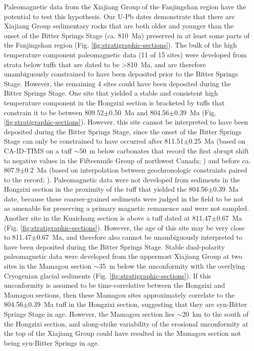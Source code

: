 Paleomagnetic data from the Xiajiang Group of the Fanjingshan region have the potential to test this hypothesis. Our U-Pb dates demonstrate that there are Xiajiang Group sedimentary rocks that are both older and younger than the onset of the Bitter Springs Stage (ca. 810~Ma) preserved in at least some parts of the Fanjingshan region (Fig. \ref{fig:stratigraphic-sections}). The bulk of the high temperature component paleomagnetic data (11 of 15 sites) were developed from strata below tuffs that are dated to be \textgreater 810~Ma, and are therefore unambiguously constrained to have been deposited prior to the Bitter Springs Stage. However, the remaining 4 sites could have been deposited during the Bitter Springs Stage. One site that yielded a stable and consistent high temperature component in the Hongzixi section is bracketed by tuffs that constrain it to be between 809.52$\pm$0.50~Ma and 804.56$\pm$0.39~Ma (Fig. \ref{fig:stratigraphic-sections}). However, this site cannot be interpreted to have been deposited during the Bitter Springs Stage, since the onset of the Bitter Springs Stage can only be constrained to have occurred after 811.51$\pm$0.25~Ma (based on CA-ID-TIMS on a tuff $\sim$50~m below carbonates that record the first abrupt shift to negative \dC values in the Fifteenmile Group of northwest Canada; \citealp{Macdonald2010a}) and before ca. 807.9$\pm$0.2~Ma (based on interpolation between geochronologic constraints paired to the \dC record; \citealp{Swanson-Hysell2015a}). Paleomagnetic data were not developed from sediments in the Hongzixi section in the proximity of the tuff that yielded the 804.56$\pm$0.39~Ma date, because these coarser-grained sediments were judged in the field to be not as amenable for preserving a primary magnetic remanence and were not sampled. Another site in the Kuaichang section is above a tuff dated at 811.47$\pm$0.67~Ma (Fig. \ref{fig:stratigraphic-sections}). However, the age of this site may be very close to 811.47$\pm$0.67~Ma, and therefore also cannot be unambiguously interpreted to have been deposited during the Bitter Springs Stage. Stable dual-polarity paleomagnetic data were developed from the uppermost Xiajiang Group at two sites in the Mamagou section $\sim$35~m below the unconformity with the overlying Cryogenian glacial sediments (Fig. \ref{fig:stratigraphic-sections}). If this unconformity is assumed to be time-correlative between the Hongzixi and Mamagou sections, then these Mamagou sites approximately correlate to the 804.56$\pm$0.39~Ma tuff in the Hongzixi section, suggesting that they are syn-Bitter Springs Stage in age. However, the Mamagou section lies $\sim$20~km to the south of the Hongzixi section, and along-strike variability of the erosional unconformity at the top of the Xiajiang Group could have resulted in the Mamagou section not being syn-Bitter Springs in age.

